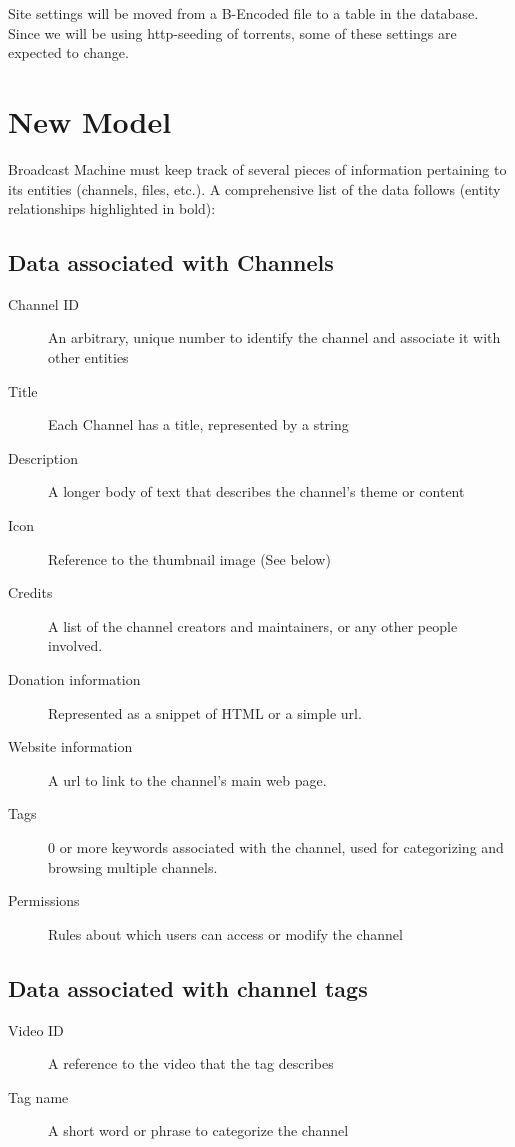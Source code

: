 \documentclass[a4paper,12pt]{report}
\begin{document}
Site settings will be moved from a B-Encoded file to a table in the database. Since we will be using http-seeding of torrents, some of these settings are expected to change.


\section{New Model}
Broadcast Machine must keep track of several pieces of information pertaining to its entities (channels, files, etc.).
A comprehensive list of the data follows (entity relationships highlighted in bold):


\subsection{Data associated with Channels}
\begin{description}
\item[Channel ID] An arbitrary, unique number to identify the channel and  associate it with other entities
\item[Title] Each Channel has a title, represented by a string
\item[Description] A longer body of text that describes the channel's theme or content
\item[Icon] Reference to the thumbnail image (See below)
\item[Credits] A list of the channel creators and maintainers, or any other people involved.
\item[Donation information] Represented as a snippet of HTML or a simple url.
\item[Website information] A url to link to the channel's main web page.
\item[Tags] 0 or more keywords associated with the channel, used for categorizing and browsing multiple channels.
\item[Permissions] Rules about which users can access or modify the channel
\end{description}

\subsection{Data associated with channel tags}
\begin{description}
\item[Video ID] A reference to the video that the tag describes
\item[Tag name] A short word or phrase to categorize the channel
\end{description}
\end{document}
